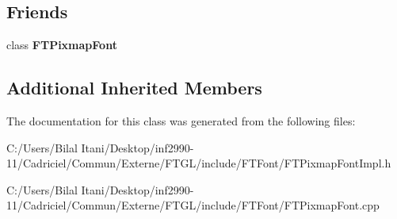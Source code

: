 \subsection*{Friends}
\begin{DoxyCompactItemize}
\item 
class {\bfseries F\+T\+Pixmap\+Font}\hypertarget{class_f_t_pixmap_font_impl_ac7f382db9ff9f02888b67b7434d7edd4}{}\label{class_f_t_pixmap_font_impl_ac7f382db9ff9f02888b67b7434d7edd4}

\end{DoxyCompactItemize}
\subsection*{Additional Inherited Members}


The documentation for this class was generated from the following files\+:\begin{DoxyCompactItemize}
\item 
C\+:/\+Users/\+Bilal Itani/\+Desktop/inf2990-\/11/\+Cadriciel/\+Commun/\+Externe/\+F\+T\+G\+L/include/\+F\+T\+Font/F\+T\+Pixmap\+Font\+Impl.\+h\item 
C\+:/\+Users/\+Bilal Itani/\+Desktop/inf2990-\/11/\+Cadriciel/\+Commun/\+Externe/\+F\+T\+G\+L/include/\+F\+T\+Font/F\+T\+Pixmap\+Font.\+cpp\end{DoxyCompactItemize}

